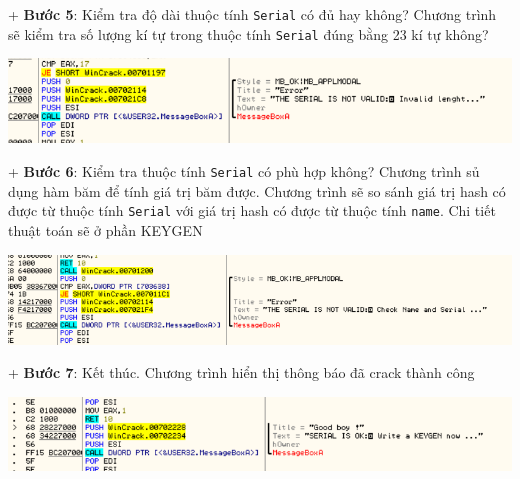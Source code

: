 + \textbf{Bước 5}: Kiểm tra độ dài thuộc tính \texttt{Serial} có đủ hay không?
Chương trình sẽ kiểm tra số lượng kí tự trong thuộc tính \texttt{Serial} đúng bằng 23 kí tự không?\\
\begin{center}
    \includegraphics[width=\textwidth]{img/file-2/asm7.PNG}
\end{center}
+ \textbf{Bước 6}: Kiểm tra thuộc tính \texttt{Serial} có phù hợp không? Chương trình sủ dụng hàm băm để tính giá trị băm được.
Chương trình sẽ so sánh giá trị hash có được từ thuộc tính \texttt{Serial} với giá trị hash có được từ thuộc tính \texttt{name}. Chi tiết thuật toán sẽ ở phần KEYGEN\\
\begin{center}
    \includegraphics[width=\textwidth]{img/file-2/asm8.PNG}
\end{center}
+ \textbf{Bước 7}: Kết thúc. Chương trình hiển thị thông báo đã crack thành công\\
\begin{center}
    \includegraphics[width=\textwidth]{img/file-2/asm9.PNG}
\end{center}

